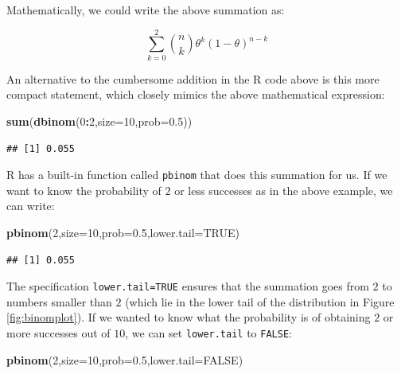 \documentclass[12pt,]{krantz}
\newenvironment{Shaded}{\begin{snugshade}}{\end{snugshade}}
\newcommand{\DataTypeTok}[1]{\textcolor[rgb]{0.13,0.29,0.53}{#1}}
\newcommand{\DecValTok}[1]{\textcolor[rgb]{0.00,0.00,0.81}{#1}}
\newcommand{\FloatTok}[1]{\textcolor[rgb]{0.00,0.00,0.81}{#1}}
\newcommand{\KeywordTok}[1]{\textcolor[rgb]{0.13,0.29,0.53}{\textbf{#1}}}
\newcommand{\NormalTok}[1]{#1}
\newcommand{\OperatorTok}[1]{\textcolor[rgb]{0.81,0.36,0.00}{\textbf{#1}}}
\newcommand{\OtherTok}[1]{\textcolor[rgb]{0.56,0.35,0.01}{#1}}
\theoremstyle{definition}
\theoremstyle{definition}
\theoremstyle{definition}
\theoremstyle{remark}
\begin{document}
Mathematically, we could write the above summation as:

\begin{equation}
\sum_{k=0}^2 \binom{n}{k} \theta^{k} (1-\theta)^{n-k} 
\end{equation}

An alternative to the cumbersome addition in the R code above is this more compact statement, which closely mimics the above mathematical expression:

\begin{Shaded}
\begin{Highlighting}[]
\KeywordTok{sum}\NormalTok{(}\KeywordTok{dbinom}\NormalTok{(}\DecValTok{0}\OperatorTok{:}\DecValTok{2}\NormalTok{,}\DataTypeTok{size=}\DecValTok{10}\NormalTok{,}\DataTypeTok{prob=}\FloatTok{0.5}\NormalTok{))}
\end{Highlighting}
\end{Shaded}

\begin{verbatim}
## [1] 0.055
\end{verbatim}

R has a built-in function called \texttt{pbinom} that does this summation for us. If we want to know the probability of \(2\) or less successes as in the above example, we can write:

\begin{Shaded}
\begin{Highlighting}[]
\KeywordTok{pbinom}\NormalTok{(}\DecValTok{2}\NormalTok{,}\DataTypeTok{size=}\DecValTok{10}\NormalTok{,}\DataTypeTok{prob=}\FloatTok{0.5}\NormalTok{,}\DataTypeTok{lower.tail=}\OtherTok{TRUE}\NormalTok{)}
\end{Highlighting}
\end{Shaded}

\begin{verbatim}
## [1] 0.055
\end{verbatim}

The specification \texttt{lower.tail=TRUE} ensures that the summation goes from \(2\) to numbers smaller than \(2\) (which lie in the lower tail of the distribution in Figure \ref{fig:binomplot}). If we wanted to know what the probability is of obtaining \(2\) or more successes out of \(10\), we can set \texttt{lower.tail} to \texttt{FALSE}:

\begin{Shaded}
\begin{Highlighting}[]
\KeywordTok{pbinom}\NormalTok{(}\DecValTok{2}\NormalTok{,}\DataTypeTok{size=}\DecValTok{10}\NormalTok{,}\DataTypeTok{prob=}\FloatTok{0.5}\NormalTok{,}\DataTypeTok{lower.tail=}\OtherTok{FALSE}\NormalTok{)}
\end{Highlighting}
\end{Shaded}
\end{document}
